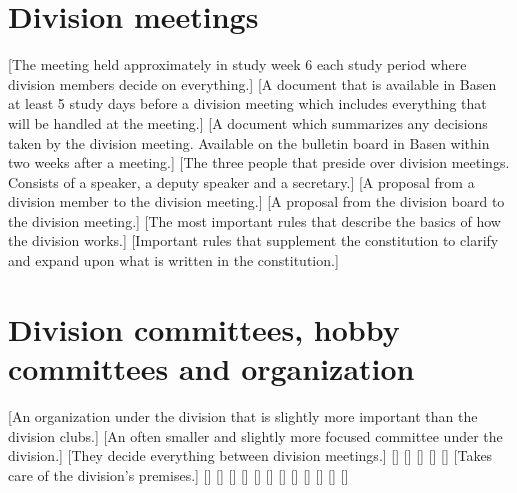 \documentclass[a4paper]{dtek}
\begin{document}
\section{Division meetings}
\begin{description}
    [The meeting held approximately in study week 6 each study period where division members decide on everything.]
    [A document that is available in Basen at least 5 study days before a division meeting which includes everything that will be handled at the meeting.]
    [A document which summarizes any decisions taken by the division meeting. Available on the bulletin board in Basen within two weeks after a meeting.]
    [The three people that preside over division meetings. Consists of a speaker, a deputy speaker and a secretary.]
    [A proposal from a division member to the division meeting.]
    [A proposal from the division board to the division meeting.]
    [The most important rules that describe the basics of how the division works.]
    [Important rules that supplement the constitution to clarify and expand upon what is written in the constitution.]
\end{description}

\section{Division committees, hobby committees and organization}

\begin{description}
    [An organization under the division that is slightly more important than the division clubs.]
    [An often smaller and slightly more focused committee under the division.]
    [They decide everything between division meetings.]
    []
    []
    []
    []
    []
    [Takes care of the division's premises.]
    []
    []
    []
    []
    []
    []
    []
    []
    []
    []
    []
    []
\end{description}
\end{document}
